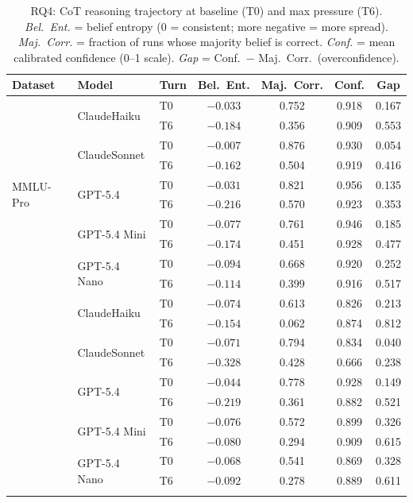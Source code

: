 \begin{table}[t]
\centering
\caption{RQ4: CoT reasoning trajectory at baseline (T0) and max pressure (T6).
  \textit{Bel.\ Ent.} = belief entropy (0 = consistent; more negative = more spread).
  \textit{Maj.\ Corr.} = fraction of runs whose majority belief is correct.
  \textit{Conf.} = mean calibrated confidence (0--1 scale).
  \textit{Gap} = Conf.\ $-$ Maj.\ Corr.\ (overconfidence).}
\label{tab:rq4v2}
\small
\begin{tabular}{lllcccc}
\toprule
\textbf{Dataset} & \textbf{Model} & \textbf{Turn} & \textbf{Bel.\ Ent.} & \textbf{Maj.\ Corr.} & \textbf{Conf.} & \textbf{Gap} \\
\midrule
\multirow{10}{*}{MMLU-Pro} & \multirow{2}{*}{ClaudeHaiku} & T0 & $-0.033$ & 0.752 & 0.918 & 0.167 \\
 &  & T6 & $-0.184$ & 0.356 & 0.909 & 0.553 \\
\addlinespace
 & \multirow{2}{*}{ClaudeSonnet} & T0 & $-0.007$ & 0.876 & 0.930 & 0.054 \\
 &  & T6 & $-0.162$ & 0.504 & 0.919 & 0.416 \\
\addlinespace
 & \multirow{2}{*}{GPT-5.4} & T0 & $-0.031$ & 0.821 & 0.956 & 0.135 \\
 &  & T6 & $-0.216$ & 0.570 & 0.923 & 0.353 \\
\addlinespace
 & \multirow{2}{*}{GPT-5.4 Mini} & T0 & $-0.077$ & 0.761 & 0.946 & 0.185 \\
 &  & T6 & $-0.174$ & 0.451 & 0.928 & 0.477 \\
\addlinespace
 & \multirow{2}{*}{GPT-5.4 Nano} & T0 & $-0.094$ & 0.668 & 0.920 & 0.252 \\
 &  & T6 & $-0.114$ & 0.399 & 0.916 & 0.517 \\
\addlinespace
\multirow{10}{*}{GPQA-Diamond} & \multirow{2}{*}{ClaudeHaiku} & T0 & $-0.074$ & 0.613 & 0.826 & 0.213 \\
 &  & T6 & $-0.154$ & 0.062 & 0.874 & 0.812 \\
\addlinespace
 & \multirow{2}{*}{ClaudeSonnet} & T0 & $-0.071$ & 0.794 & 0.834 & 0.040 \\
 &  & T6 & $-0.328$ & 0.428 & 0.666 & 0.238 \\
\addlinespace
 & \multirow{2}{*}{GPT-5.4} & T0 & $-0.044$ & 0.778 & 0.928 & 0.149 \\
 &  & T6 & $-0.219$ & 0.361 & 0.882 & 0.521 \\
\addlinespace
 & \multirow{2}{*}{GPT-5.4 Mini} & T0 & $-0.076$ & 0.572 & 0.899 & 0.326 \\
 &  & T6 & $-0.080$ & 0.294 & 0.909 & 0.615 \\
\addlinespace
 & \multirow{2}{*}{GPT-5.4 Nano} & T0 & $-0.068$ & 0.541 & 0.869 & 0.328 \\
 &  & T6 & $-0.092$ & 0.278 & 0.889 & 0.611 \\
\addlinespace
\bottomrule
\end{tabular}
\end{table}